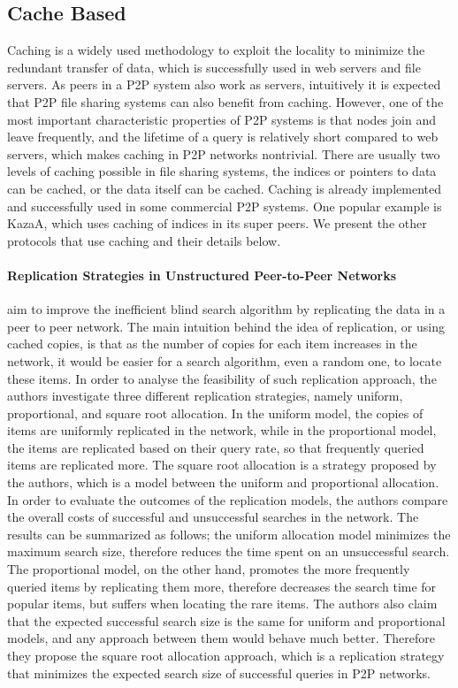 \documentclass[acmcsur]{acmtrans2m}
\begin{document}
\subsection{Cache Based}
Caching is a widely used methodology to exploit the locality to minimize the
redundant transfer of data, which is successfully used in web servers and file servers.
As peers in a P2P system also work as servers, intuitively it is expected that
P2P file sharing systems can also benefit from caching. However, one of the most
important characteristic properties of P2P systems is that nodes
join and leave frequently, and the lifetime of a query is relatively short
compared to web servers, which makes caching in P2P networks nontrivial. There are
usually two levels of caching possible in file sharing systems, the indices or
pointers to data can be cached, or the data itself can be cached. Caching is
already implemented and successfully used in some commercial P2P systems. One
popular example is KazaA, which uses caching of indices in its super peers.
We present the other protocols that use caching and their details below.

\paragraph*{\bf Replication Strategies in Unstructured Peer-to-Peer Networks}

\cite{Cohen02} aim to improve the inefficient blind search algorithm by
replicating the data in a peer to peer network. The main intuition behind the
idea of replication, or using cached copies, is that as the number of copies for
each item increases in the network, it would be easier for a search algorithm,
even a random one, to locate these items. In order to analyse the feasibility of
such replication approach, the authors investigate three different replication
strategies, namely uniform, proportional, and square root allocation. In the
uniform model, the copies of items are uniformly replicated in the network,
while in the proportional model, the items are replicated based on their query
rate, so that frequently queried items are replicated more. The square root
allocation is a strategy proposed by the authors, which is a model between the
uniform and proportional allocation.  In order to evaluate the outcomes of the
replication models, the authors compare the overall costs of successful and
unsuccessful searches in the network. The results can be summarized as follows;
the uniform allocation model minimizes the maximum search size, therefore
reduces the time spent on an unsuccessful search. The proportional model, on
the other hand, promotes the more frequently queried items by replicating them
more, therefore decreases the search time for popular items, but suffers when
locating the rare items. The authors also claim that the expected successful
search size is the same for uniform and proportional models, and any approach
between them would behave much better. Therefore they propose the square root
allocation approach, which is a replication strategy that minimizes the expected
search size of successful queries in P2P networks.
\end{document}
